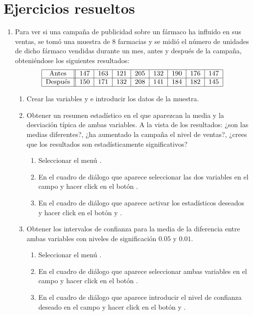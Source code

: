 \section{Ejercicios resueltos}
\begin{enumerate}[leftmargin=*] 
\item  Para ver si una campaña de publicidad sobre un fármaco ha influido en sus ventas,
se tomó una muestra de 8 farmacias y se midió el número de unidades de dicho fármaco vendidas durante un mes, antes y
después de la campaña, obteniéndose los siguientes resultados: 
\[
\begin{tabular}{|c||c|c|c|c|c|c|c|c|}
\hline Antes & 147 & 163 & 121 & 205 & 132 & 190 & 176 & 147 \\
\hline Después & 150 & 171 & 132 & 208 & 141 & 184 & 182 & 145
\\ \hline
\end{tabular}
\]

\begin{enumerate}
\item Crear las variables  y  e introducir los datos de la muestra.

\item Obtener un resumen estadístico en el que aparezcan la media y la desviación típica de ambas variables. A la vista
de los resultados: ¿son las medias diferentes?, ¿ha aumentado la campaña el nivel de ventas?, ¿crees que los resultados
son estadísticamente significativos? 
\begin{indicacion}
\begin{enumerate}
\item Seleccionar el menú .
\item En el cuadro de diálogo que aparece seleccionar las dos
variables en el campo  y hacer click en el botón .
\item En el cuadro de diálogo que aparece activar los estadísticos 
deseados y hacer click en el botón  y .
\end{enumerate}
\end{indicacion}

\item Obtener los intervalos de confianza para la media de la diferencia entre ambas variables con niveles de
significación $0.05$ y $0.01$.
\begin{indicacion}
\begin{enumerate}
\item Seleccionar el menú .
\item En el cuadro de diálogo que aparece seleccionar ambas variables en el campo  y hacer click en el botón .
\item En el cuadro de diálogo que aparece introducir el nivel de confianza deseado en el 
campo  y hacer click en 
el botón  y .
\end{enumerate}
\end{indicacion}



\end{enumerate}
\end{enumerate}
